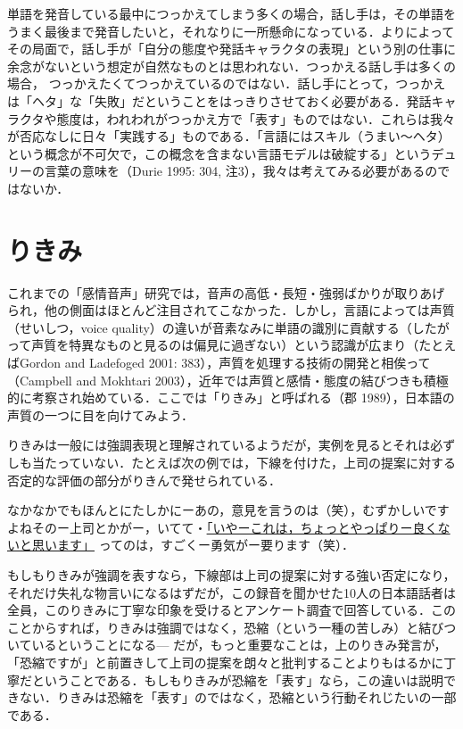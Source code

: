\documentclass[japanese]{jnlp_1.3b}
\begin{document}
単語を発音している最中につっかえてしまう多くの場合，話し手は，その単語をうまく最後まで発音したいと，それなりに一所懸命になっている．よりによってその局面で，話し手が「自分の態度や発話キャラクタの表現」という別の仕事に余念がないという想定が自然なものとは思われない．つっかえる話し手は多くの場合， つっかえたくてつっかえているのではない．話し手にとって，つっかえは「ヘタ」な「失敗」だということをはっきりさせておく必要がある．発話キャラクタや態度は，われわれがつっかえ方で「表す」ものではない．これらは我々が否応なしに日々「実践する」ものである．「言語にはスキル（うまい〜ヘタ）という概念が不可欠で，この概念を含まない言語モデルは破綻する」というデュリーの言葉の意味を（Durie 1995: 304, 注3），我々は考えてみる必要があるのではないか．


\section{りきみ}

これまでの「感情音声」研究では，音声の高低・長短・強弱ばかりが取りあげられ，他の側面はほとんど注目されてこなかった．しかし，言語によっては声質（せいしつ，voice quality）の違いが音素なみに単語の識別に貢献する（したがって声質を特異なものと見るのは偏見に過ぎない）という認識が広まり（たとえばGordon and Ladefoged 2001: 383），声質を処理する技術の開発と相俟って（Campbell and Mokhtari 2003），近年では声質と感情・態度の結びつきも積極的に考察され始めている．ここでは「りきみ」と呼ばれる（郡 1989），日本語の声質の一つに目を向けてみよう．

りきみは一般には強調表現と理解されているようだが，実例を見るとそれは必ずしも当たっていない．たとえば次の例では，下線を付けた，上司の提案に対する否定的な評価の部分がりきんで発せられている．
\vspace{\baselineskip}

なかなかでもほんとにたしかにーあの，意見を言うのは（笑），むずかしいですよねそのー上司とかがー，いてて・\underline{「いやーこれは，ちょっとやっぱりー良くないと思います」}
ってのは，すごくー勇気がー要ります（笑）．
\vspace{\baselineskip}

もしもりきみが強調を表すなら，下線部は上司の提案に対する強い否定になり，それだけ失礼な物言いになるはずだが，この録音を聞かせた10人の日本語話者は全員，このりきみに丁寧な印象を受けるとアンケート調査で回答している．このことからすれば，りきみは強調ではなく，恐縮（という一種の苦しみ）と結びついているということになる—
だが，もっと重要なことは，上のりきみ発言が，「恐縮ですが」と前置きして上司の提案を朗々と批判することよりもはるかに丁寧だということである．もしもりきみが恐縮を「表す」なら，この違いは説明できない．りきみは恐縮を「表す」のではなく，恐縮という行動それじたいの一部である．
\end{document}
